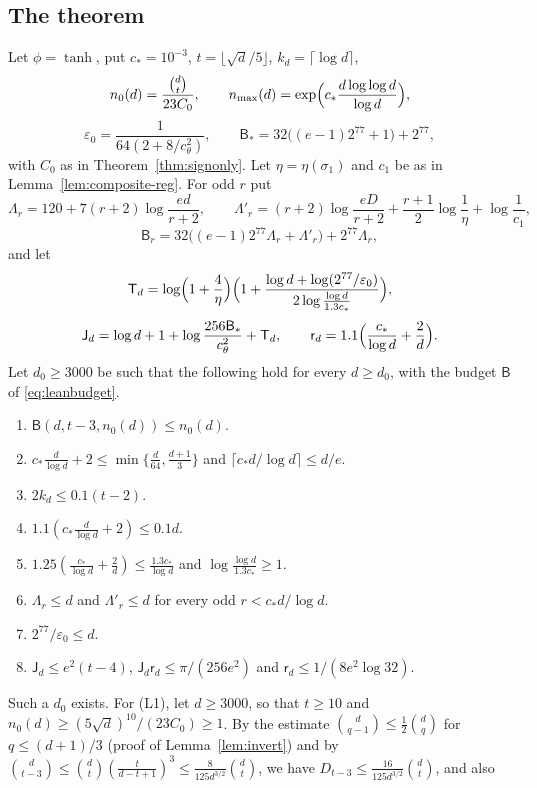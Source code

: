 \subsection{The theorem}\label{sec:S1}
Let $\phi=\tanh$, put $c_*=10^{-3}$, $t=\lfloor\sqrt d/5\rfloor$,
$k_d=\lceil\log d\rceil$,
\[
 n_0(d)=\frac{\binom dt}{23C_0},\qquad
 n_{\max}(d)=\exp\Bigl(c_*\frac{d\log\log d}{\log d}\Bigr),
\]
\[
 \varepsilon_0=\frac1{64(2+8/c_\theta^2)},\qquad
 \mathsf B_*=32\bigl((e-1)2^{77}+1\bigr)+2^{77},
\]
with $C_0$ as in Theorem~\ref{thm:signonly}. Let $\eta=\eta(\sigma_1)$
and $c_1$ be as in Lemma~\ref{lem:composite-reg}. For odd $r$ put
\[
 \Lambda_r=120+7(r+2)\log\frac{ed}{r+2},\qquad
 \Lambda'_r=(r+2)\log\frac{eD}{r+2}+\frac{r+1}2\log\frac1\eta
 +\log\frac1{c_1},
\]
\[
 \mathsf B_r=32\bigl((e-1)2^{77}\Lambda_r+\Lambda'_r\bigr)+2^{77}\Lambda_r,
\]
and let
\[
 \mathsf T_d=\log\Bigl(1+\frac4\eta\Bigr)\Bigl(1+\frac{\log d
 +\log(2^{77}/\varepsilon_0)}{2\log\frac{\log d}{1.3c_*}}\Bigr),
\]
\[
 \mathsf J_d=\log d+1+\log\frac{256\mathsf B_*}{c_\theta^2}+\mathsf T_d,\qquad
 \mathsf r_d=1.1\Bigl(\frac{c_*}{\log d}+\frac2d\Bigr).
\]
Let $d_0\ge3000$ be such that the following hold for every $d\ge d_0$,
with the budget $\mathsf B$ of \eqref{eq:leanbudget}.
\begin{enumerate}
\item[(L1)] $\mathsf B(d,t-3,n_0(d))\le n_0(d)$.
\item[(L2)] $c_*\frac d{\log d}+2\le\min\{\frac d{64},\frac{d+1}3\}$ and
$\lceil c_*d/\log d\rceil\le d/e$.
\item[(L3)] $2k_d\le0.1(t-2)$.
\item[(L4)] $1.1(c_*\frac d{\log d}+2)\le0.1d$.
\item[(L5)] $1.25(\frac{c_*}{\log d}+\frac2d)\le\frac{1.3c_*}{\log d}$ and
$\log\frac{\log d}{1.3c_*}\ge1$.
\item[(L6)] $\Lambda_r\le d$ and $\Lambda'_r\le d$ for every odd
$r<c_*d/\log d$.
\item[(L7)] $2^{77}/\varepsilon_0\le d$.
\item[(L8)] $\mathsf J_d\le e^2(t-4)$, $\mathsf J_d\mathsf r_d\le
\pi/(256e^2)$ and $\mathsf r_d\le1/(8e^2\log32)$.
\end{enumerate}
Such a $d_0$ exists. For (L1), let $d\ge3000$, so that $t\ge10$ and
$n_0(d)\ge(5\sqrt d)^{10}/(23C_0)\ge1$. By the estimate
$\binom d{q-1}\le\frac12\binom dq$ for $q\le(d+1)/3$ (proof of
Lemma~\ref{lem:invert}) and by
$\binom d{t-3}\le\binom dt(\frac t{d-t+1})^3\le\frac8{125d^{3/2}}\binom dt$,
we have $D_{t-3}\le\frac{16}{125d^{3/2}}\binom dt$, and also
